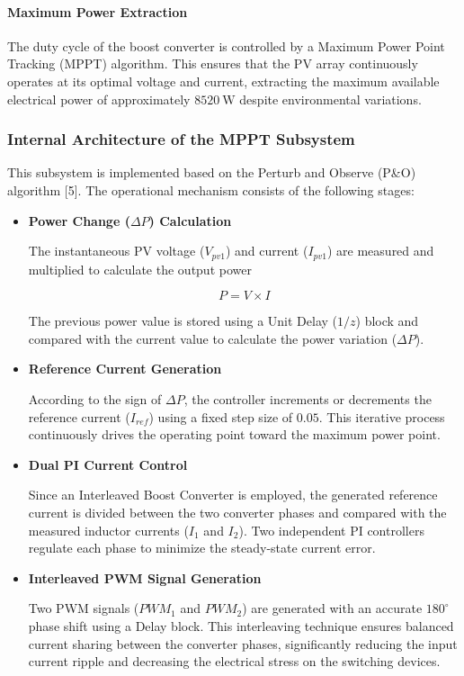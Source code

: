 \paragraph{Maximum Power Extraction}

The duty cycle of the boost converter is controlled by a Maximum Power Point Tracking (MPPT) algorithm. This ensures that the PV array continuously operates at its optimal voltage and current, extracting the maximum available electrical power of approximately $8520~\mathrm{W}$ despite environmental variations.
\newpage
\subsubsection{Internal Architecture of the MPPT Subsystem}

This subsystem is implemented based on the Perturb and Observe (P\&O) algorithm [5]. The operational mechanism consists of the following stages:

\begin{itemize}

\item \textbf{Power Change ($\Delta P$) Calculation}

The instantaneous PV voltage ($V_{pv1}$) and current ($I_{pv1}$) are measured and multiplied to calculate the output power

\begin{equation}
P=V\times I
\end{equation}

The previous power value is stored using a Unit Delay ($1/z$) block and compared with the current value to calculate the power variation ($\Delta P$).

\item \textbf{Reference Current Generation}

According to the sign of $\Delta P$, the controller increments or decrements the reference current ($I_{ref}$) using a fixed step size of $0.05$. This iterative process continuously drives the operating point toward the maximum power point.

\item \textbf{Dual PI Current Control}

Since an Interleaved Boost Converter is employed, the generated reference current is divided between the two converter phases and compared with the measured inductor currents ($I_1$ and $I_2$). Two independent PI controllers regulate each phase to minimize the steady-state current error.

\item \textbf{Interleaved PWM Signal Generation}

Two PWM signals ($PWM_1$ and $PWM_2$) are generated with an accurate $180^\circ$ phase shift using a Delay block. This interleaving technique ensures balanced current sharing between the converter phases, significantly reducing the input current ripple and decreasing the electrical stress on the switching devices.

\end{itemize}

